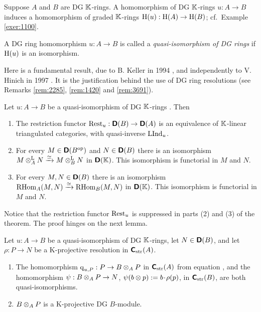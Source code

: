 \label{subsec:DGR-quisoms}

Suppose $A$ and $B$ are DG $\mathbb{K}$-rings. A homomorphism of DG $\mathbb{K}$-rings 
$u : A \to B$ induces a homomorphism of graded $\mathbb{K}$-rings 
$\operatorname{H}(u) : \operatorname{H}(A) \to \operatorname{H}(B)$; cf.\ Example \ref{exer:1100}.

\begin{dfn} \label{dfn:3085}
A DG ring homomorphism $u : A \to B$ is called a 
{\em quasi-isomorphism of DG rings}%
if $\operatorname{H}(u)$ is an isomorphism. 
\end{dfn}

Here is a fundamental result, due to B. Keller in 1994 \cite{Kel1}, 
and independently to V. Hinich in 1997 \cite{Hi1}. 
It is the justification behind the use of DG ring resolutions
(see Remarks \ref{rem:2285}, \ref{rem:1420} and \ref{rem:3691}). 

\begin{thm} \label{thm:2363}
Let $u : A \to B$ be a quasi-isomorphism of DG $\mathbb{K}$-rings%
.
Then\tup{:}
\begin{enumerate}
\item The restriction functor 
$\operatorname{Rest}_u : \boldsymbol{\mathsf{D}}(B) \to \boldsymbol{\mathsf{D}}(A)$
is an equivalence of $\mathbb{K}$-linear triangulated categories, with quasi-inverse
$\operatorname{LInd}_u$. 

\item For every $M \in \boldsymbol{\mathsf{D}}(B^{\mathrm{op}})$ and 
$N \in \boldsymbol{\mathsf{D}}(B)$ there is an  isomorphism
$M \otimes^{\mathrm{L}}_A N \xrightarrow{\simeq} M \otimes^{\mathrm{L}}_B N$
in $\boldsymbol{\mathsf{D}}(\mathbb{K})$. This isomorphism is functorial in $M$ and $N$.

\item For every $M, N \in \boldsymbol{\mathsf{D}}(B)$ there is an isomorphism 
$\opn{RHom}_{A}(M, N) \iso \lb \opn{RHom}_{B}(M, N)$
in $\boldsymbol{\mathsf{D}}(\mathbb{K})$. This isomorphism is functorial in $M$ and $N$.
\end{enumerate}
\end{thm}

Notice that the restriction functor $\operatorname{Rest}_u$ is suppressed in parts (2) 
and (3) of the theorem. The proof hinges on the next lemma. 

\begin{lem} \label{lem:4770}
Let $u : A \to B$ be a quasi-isomorphism of DG $\mathbb{K}$-rings, let 
$N \in \boldsymbol{\mathsf{D}}(B)$, and let $\rho : P \to N$ be a K-projective resolution in 
$\boldsymbol{\mathsf{C}}_{\mathrm{str}}(A)$. 
\begin{enumerate}
\item The homomorphism
$\operatorname{q}_{u, P} : P \to B \otimes_A P$
in $\boldsymbol{\mathsf{C}}_{\mathrm{str}}(A)$ from equation \lb \tup{(\ref{eqn:3194})}, and the 
homomorphism 
$\psi : B \otimes_A P \to N$, $\psi(b \otimes p) := b \mspace{1.5mu}{\cdot}\mspace{1.5mu} \rho(p)$,  
in $\boldsymbol{\mathsf{C}}_{\mathrm{str}}(B)$, are both quasi-isomorphisms.

\item $B \otimes_A P$ is a K-projective DG $B$-module.
\end{enumerate}
\end{lem}

